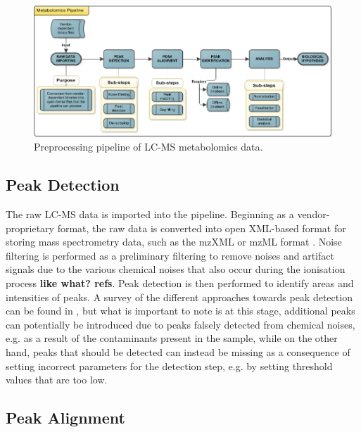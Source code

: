 \begin{figure}[htb!]
\noindent \centering{}\includegraphics[width=1\textwidth]{02-background/figures/Drawing1}\caption{\label{fig:Preprocessing-pipeline-of}Preprocessing pipeline of LC-MS metabolomics data.}
\end{figure}

\subsection{Peak Detection\label{sub:related-peaks}}

The raw LC-MS data is imported into the pipeline. Beginning as a vendor-proprietary format, the raw data is converted into open XML-based format for storing mass spectrometry data, such as the mzXML or mzML format \cite{Pedrioli2004}. Noise filtering is performed as a preliminary filtering to remove noises and artifact signals due to the various chemical noises that also occur during the ionisation process \textbf{like what? refs}. Peak detection is then performed to identify areas and intensities of peaks. A survey of the different approaches towards peak detection can be found in \cite{Zhang2009}, but what is important to note is at this stage, additional peaks can potentially be introduced due to peaks falsely detected from chemical noises, e.g. as a result of the contaminants present in the sample, while on the other hand, peaks that should be detected can instead be missing as a consequence of setting incorrect parameters for the detection step, e.g. by setting threshold values that are too low. 

\subsection{Peak Alignment\label{sub:alignment-tools}}

